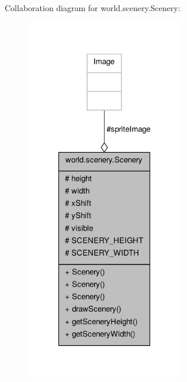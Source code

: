 Collaboration diagram for world.\-scenery.\-Scenery\-:
\nopagebreak
\begin{figure}[H]
\begin{center}
\leavevmode
\includegraphics[width=198pt]{classworld_1_1scenery_1_1_scenery__coll__graph}
\end{center}
\end{figure}
